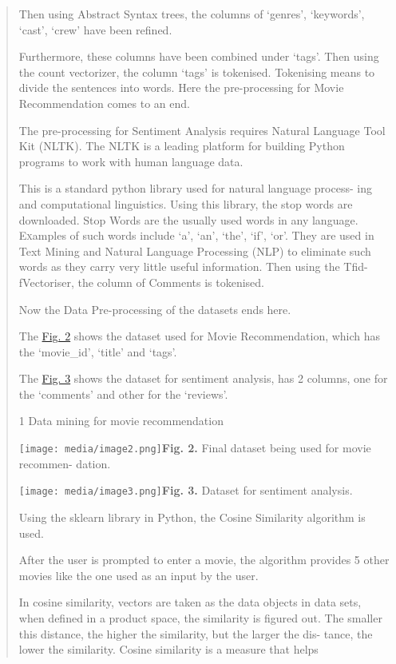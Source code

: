 \documentclass[
]{article}
\begin{document}
\begin{quote}
Then using Abstract Syntax trees, the columns of `genres', `keywords',
`cast', `crew' have been reﬁned.

Furthermore, these columns have been combined under `tags'. Then using
the count vectorizer, the column `tags' is tokenised. Tokenising means
to divide the sentences into words. Here the pre-processing for Movie
Recommendation comes to an end.

The pre-processing for Sentiment Analysis requires Natural Language Tool
Kit (NLTK). The NLTK is a leading platform for building Python programs
to work with human language data.

This is a standard python library used for natural language process- ing
and computational linguistics. Using this library, the stop words are
downloaded. Stop Words are the usually used words in any language.
E\textsc{x}amples of such words include `a', `an', `the', `if', `or'.
They are used in Text Mining and Natural Language Processing (NLP) to
eliminate such words as they carry very little useful information. Then
using the Tﬁd- fVectoriser, the column of Comments is tokenised.

Now the Data Pre-processing of the datasets ends here.

The \protect\hyperlink{_bookmark6}{Fig. 2} shows the dataset used for
Movie Recommendation, which has the `movie\_id', `title' and `tags'.

The \protect\hyperlink{_bookmark7}{Fig. 3} shows the dataset for
sentiment analysis, has 2 columns, one for the `comments' and other for
the `reviews'.

1 Data mining for movie recommendation

\texttt{[image: media/image2.png]}\protect\hypertarget{_bookmark6}{}{}\textbf{Fig.
2.} Final dataset being used for movie recommen- dation.

\texttt{[image: media/image3.png]}\protect\hypertarget{_bookmark7}{}{}\textbf{Fig.
3.} Dataset for sentiment analysis.

Using the sklearn library in Python, the Cosine Similarity algorithm is
used.

After the user is prompted to enter a movie, the algorithm provides 5
other movies like the one used as an input by the user.

In cosine similarity, vectors are taken as the data objects in data
sets, when deﬁned in a product space, the similarity is ﬁgured out. The
smaller this distance, the higher the similarity, but the larger the
dis- tance, the lower the similarity. Cosine similarity is a measure
that helps


\end{quote}
\end{document}
